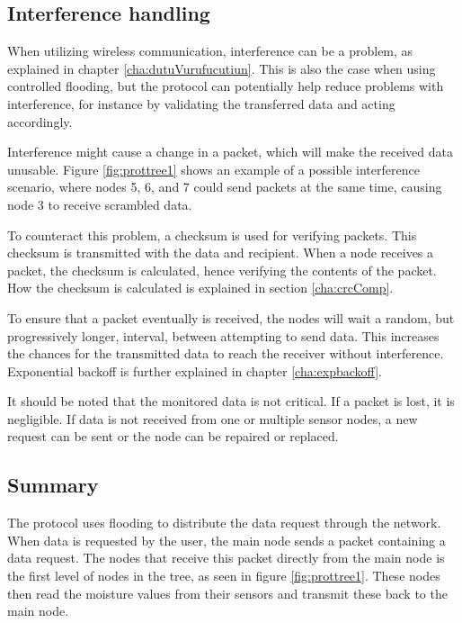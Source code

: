 \subsection{Interference handling} \label{cha:crcDesign}
When utilizing wireless communication, interference can be a problem, as explained in chapter \ref{cha:dutuVurufucutiun}. This is also the case when using controlled flooding, but the protocol can potentially help reduce problems with interference, for instance by validating the transferred data and acting accordingly.

Interference might cause a change in a packet, which will make the received data unusable. Figure \ref{fig:prottree1} shows an example of a possible interference scenario, where nodes 5, 6, and 7 could send packets at the same time, causing node 3 to receive scrambled data.

To counteract this problem, a checksum is used for verifying packets. This checksum is transmitted with the data and recipient. When a node receives a packet, the checksum is calculated, hence verifying the contents of the packet. How the checksum is calculated is explained in section \ref{cha:crcComp}.

To ensure that a packet eventually is received, the nodes will wait a random, but progressively longer, interval, between attempting to send data. This increases the chances for the transmitted data to reach the receiver without interference. Exponential backoff is further explained in chapter \ref{cha:expbackoff}.

It should be noted that the monitored data is not critical. If a packet is lost, it is negligible. If data is not received from one or multiple sensor nodes, a new request can be sent or the node can be repaired or replaced.


\subsection{Summary}
The protocol uses flooding to distribute the data request through the network. 
When data is requested by the user, the main node sends a packet containing a data request. 
The nodes that receive this packet directly from the main node is the first level of nodes in the tree, as seen in figure \ref{fig:prottree1}. 
These nodes then read the moisture values from their sensors and transmit these back to the main node. 

